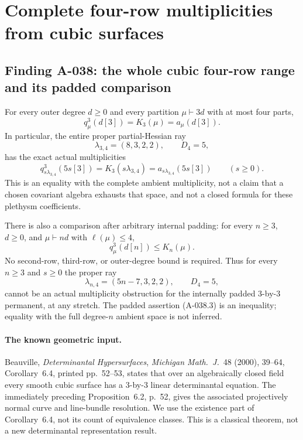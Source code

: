 \section{Complete four-row multiplicities from cubic surfaces}

\subsection*{Finding A-038: the whole cubic four-row range and its padded comparison}
For every outer degree \(d\geq0\) and every partition
\(\mu\vdash3d\) with at most four parts,
\[
                    q^3_\mu(d[3])=K_3(\mu)=a_\mu(d[3]).
                                                               \tag{A-038.1}
\]
In particular, the entire proper partial-Hessian ray
\[
       \lambda_{3,4}=(8,3,2,2),\qquad D_4=5,
\]
has the exact actual multiplicities
\[
 q^3_{s\lambda_{3,4}}(5s[3])
       =K_3(s\lambda_{3,4})
       =a_{s\lambda_{3,4}}(5s[3])
                         \qquad(s\geq0).                 \tag{A-038.2}
\]
This is an equality with the complete ambient multiplicity,
not a claim that a chosen covariant algebra exhausts that
space, and not a closed formula for these plethysm coefficients.

There is also a comparison after arbitrary internal padding:
for every \(n\geq3\), \(d\geq0\), and
\(\mu\vdash nd\) with \(\ell(\mu)\leq4\),
\[
                         q^3_\mu(d[n])\leq K_n(\mu).
                                                               \tag{A-038.3}
\]
No second-row, third-row, or outer-degree bound is required.
Thus for every \(n\geq3\) and \(s\geq0\) the proper ray
\[
             \lambda_{n,4}=(5n-7,3,2,2),\qquad D_4=5,
\]
cannot be an actual multiplicity obstruction for the internally
padded \(3\)-by-\(3\) permanent, at any stretch.
The padded assertion (A-038.3) is an inequality; equality with
the full degree-\(n\) ambient space is not inferred.

\paragraph{The known geometric input.}
Beauville, \emph{Determinantal Hypersurfaces},
\emph{Michigan Math.\ J.}\ 48 (2000), 39--64,
Corollary~6.4, printed pp.~52--53, states that over an
algebraically closed field every smooth cubic surface has
a \(3\)-by-\(3\) linear determinantal equation. The immediately
preceding Proposition~6.2, p.~52, gives the associated
projectively normal curve and line-bundle resolution.
We use the existence part of Corollary~6.4, not its count of
equivalence classes. This is a classical theorem, not a
new determinantal representation result.

